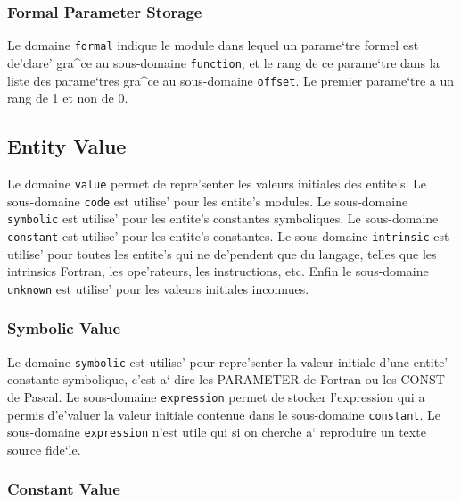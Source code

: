 \subsubsection{Formal Parameter Storage}
\label{subsubsection-formal}

{
Le domaine \verb/formal/ indique le module dans lequel un parame`tre formel
est de'clare' gra^ce au sous-domaine \verb/function/, et le rang de ce
parame`tre dans la liste des parame`tres gra^ce au sous-domaine
\verb/offset/.
Le premier parame`tre a un rang de 1 et non de 0.
}

\subsection{Entity Value}
\label{subsection-value}

{
Le domaine \verb/value/ permet de repre'senter les
valeurs initiales des entite's. Le sous-domaine \verb/code/ est utilise'
pour les entite's modules. Le sous-domaine \verb/symbolic/ est utilise'
pour les entite's constantes symboliques. Le sous-domaine
\verb/constant/ est utilise' pour les entite's constantes. Le
sous-domaine \verb/intrinsic/ est utilise' pour toutes les entite's qui
ne de'pendent que du langage, telles que les intrinsics Fortran, les
ope'rateurs, les instructions, etc. Enfin le sous-domaine
\verb/unknown/ est utilise' pour les valeurs initiales inconnues.
}

\subsubsection{Symbolic Value}
\label{subsubsection-symbolic}

{
Le domaine \verb/symbolic/ est utilise' pour repre'senter la valeur
initiale d'une entite' constante symbolique, c'est-a`-dire les PARAMETER
de Fortran ou les CONST de Pascal. Le sous-domaine \verb/expression/
permet de stocker l'expression qui a permis d'e'valuer la valeur
initiale contenue dans le sous-domaine \verb/constant/. Le sous-domaine
\verb/expression/ n'est utile qui si on cherche a` reproduire un texte
source fide`le.
}

\subsubsection{Constant Value}
\label{subsubsection-constant}

